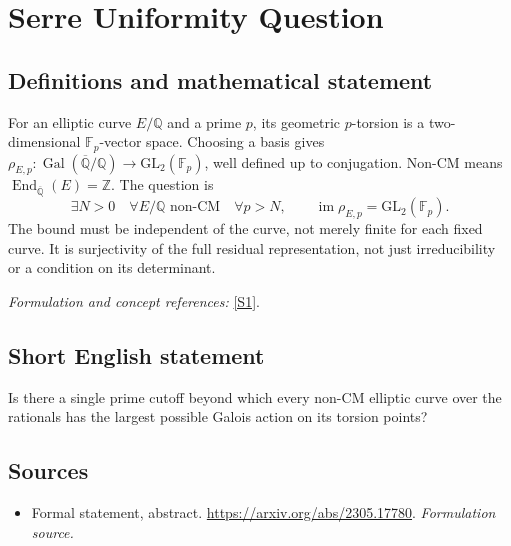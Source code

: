 \documentclass[11pt]{article}
\begin{document}
\section*{\texorpdfstring{Serre Uniformity Question}{Serre Uniformity Question}}\label{236}
\subsection{Definitions and mathematical statement}
For an elliptic curve $E/{\mathbb{Q}}$ and a prime $p$, its geometric $p$-torsion is a two-dimensional ${\mathbb{F}}_p$-vector space. Choosing a basis gives
$\rho_{E,p}:\operatorname{Gal}(\overline{{\mathbb{Q}}}/{\mathbb{Q}})\to\mathrm{GL}_2({\mathbb{F}}_p)$, well defined up to conjugation. Non-CM means $\operatorname{End}_{\overline{{\mathbb{Q}}}}(E)={\mathbb{Z}}$. The question is
\[
 \exists N>0\quad\forall E/{\mathbb{Q}}\text{ non-CM}\quad\forall p>N,
 \qquad\operatorname{im}\rho_{E,p}=\mathrm{GL}_2({\mathbb{F}}_p).
\]
The bound must be independent of the curve, not merely finite for each fixed curve. It is surjectivity of the full residual representation, not just irreducibility or a condition on its determinant.
\par\smallskip\textit{Formulation and concept references:} \href{https://arxiv.org/abs/2305.17780}{[S1]}.

\subsection{Short English statement}
Is there a single prime cutoff beyond which every non-CM elliptic curve over the rationals has the largest possible Galois action on its torsion points?
\subsection{Sources}
\begin{itemize}
\item[S1]Formal statement, abstract.
\url{https://arxiv.org/abs/2305.17780}.
\textit{Formulation source.}
\end{itemize}
\end{document}
